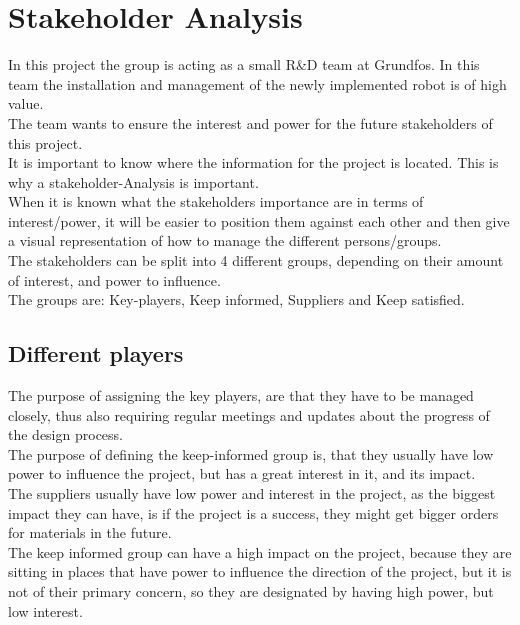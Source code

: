 \chapter{Stakeholder Analysis} \label{ch:Stakeholder Analysis}

In this project the group is acting as a small R\&D team at Grundfos. In this team the installation and management of the newly implemented robot is of high value.\\
The team wants to ensure the interest and power for the future stakeholders of this project.\\
It is important to know where the information for the project is located. This is why a stakeholder-Analysis is important.\\
When it is known what the stakeholders importance are in terms of interest/power, it will be easier to position them against each other and then give a visual representation of how to manage the different persons/groups.\\


The stakeholders can be split into 4 different groups, depending on their amount of interest, and power to influence.\\
The groups are: Key-players, Keep informed, Suppliers and Keep satisfied.\\
\section{Different players}

The purpose of assigning the key players, are that they have to be managed closely, thus also requiring regular meetings and updates about the progress of the design process.\\
The purpose of defining the keep-informed group is, that they usually have low power to influence the project, but has a great interest in it, and its impact.\\
The suppliers usually have low power and interest in the project, as the biggest impact they can have, is if the project is a success, they might get bigger orders for materials in the future.\\
The keep informed group can have a high impact on the project, because they are sitting in places that have power to influence the direction of the project, but it is not of their primary concern, so they are designated by having high power, but low interest.\\




